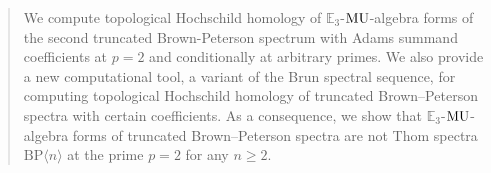 %
\begin{abstract}
We compute topological Hochschild homology of $\mathbb{E}_3$-$\MU$-algebra forms of the second truncated Brown-Peterson spectrum with Adams summand coefficients at $p=2$ and conditionally at arbitrary primes.  
We also provide a new computational tool, a variant of the Brun spectral sequence, for computing topological Hochschild homology of truncated Brown--Peterson spectra with certain coefficients. As a consequence, we show that $\mathbb{E}_3$-$\MU$-algebra forms of truncated Brown--Peterson spectra are not Thom spectra $\mathrm{BP}\langle n\rangle$ at the prime $p=2$ for any $n\ge 2$. 
\end{abstract}